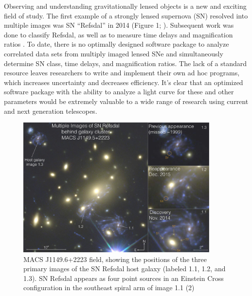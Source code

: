 \thispagestyle{fancy}
\lhead{}
\rhead{}
\renewcommand{\headrulewidth}{1pt}
\renewcommand{\footrulewidth}{0pt}
\newcommand{\packageName}{\textit{SNTD}}
\fancyfoot[C]{}

\pagestyle{fancy}

Observing and understanding gravitationally lensed objects is a new and exciting field of study. The first example of a strongly lensed supernova (SN) resolved into multiple images was SN ``Refsdal'' in 2014 (Figure 1; \citet{Kelly:2015a}). Subsequent work was done to classify Refsdal, as well as to measure time delays and magnification ratios \citep{Kelly:2016,Rodney:2016}. To date, there is no optimally designed software package to analyze correlated data sets from multiply imaged lensed SNe and simultaneously determine SN class, time delays, and magnification ratios. The lack of a standard resource leaves researchers to write and implement their own ad hoc programs, which increases uncertainty and decreases efficiency. It's clear that an optimized software package with the ability to analyze a light curve for these and other parameters would be extremely valuable to a wide range of research using current and next generation telescopes. 
\begin{figure}[h]
\centering
\includegraphics[width=0.9\textwidth]{refsdal_rodney.pdf}
\caption{MACS J1149.6+2223 field, showing the positions of the three primary images of the SN Refsdal host galaxy (labeled 1.1, 1.2, and 1.3). SN Refsdal appears as four point sources in an Einstein Cross configuration in the southeast spiral arm of image 1.1 (2)}
\end{figure}


